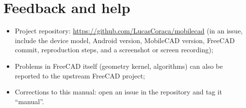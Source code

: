 \section{Feedback and help}

\begin{itemize}
  \item Project repository: \url{https://github.com/LucasCoraca/mobilecad} (in an issue, include the device model, Android version,
        MobileCAD version, FreeCAD commit, reproduction steps, and a screenshot or screen recording);
  \item Problems in FreeCAD itself (geometry kernel, algorithms) can also be reported to the upstream FreeCAD project;
  \item Corrections to this manual: open an issue in the repository and tag it ``manual''.
\end{itemize}
